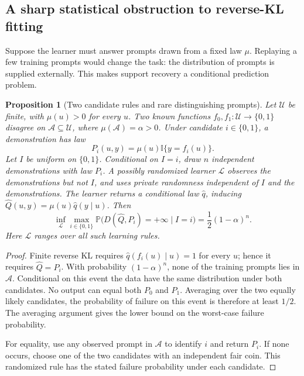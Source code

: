 \documentclass[11pt,twoside]{article}
\newcommand{\I}{\mathbb I}
\renewcommand{\P}{\mathbb P}
\newcommand{\KL}{D}
\newtheorem{proposition}[theorem]{Proposition}
\theoremstyle{definition}
\theoremstyle{remark}
\begin{document}
\subsection{A sharp statistical obstruction to reverse-KL fitting}
\label{app:conditional-support}

Suppose the learner must answer prompts drawn from a fixed law \(\mu\).
Replaying a few training prompts would change the task: the distribution
of prompts is supplied externally. This makes support recovery a
conditional prediction problem.

\begin{proposition}[Two candidate rules and rare distinguishing prompts]
\label{prop:conditional-support}
Let \(\mathcal U\) be finite, with \(\mu(u)>0\) for every \(u\).
Two known functions \(f_0,f_1:\mathcal U\to\{0,1\}\) disagree on
\(\mathcal A\subseteq\mathcal U\), where \(\mu(\mathcal A)=\alpha>0\).
Under candidate \(i\in\{0,1\}\), a demonstration has law
\[
 P_i(u,y)=\mu(u)\I\{y=f_i(u)\}.
\]
Let \(I\) be uniform on \(\{0,1\}\). Conditional on \(I=i\), draw
\(n\) independent demonstrations with law \(P_i\). A possibly randomized
learner \(\mathcal L\) observes the demonstrations but not \(I\), and uses
private randomness independent of \(I\) and the demonstrations.
The learner returns a conditional law \(\widehat q\), inducing
\(\widehat Q(u,y)=\mu(u)\widehat q(y\mid u)\).
Then
\begin{equation}
 \inf_{\mathcal L}\max_{i\in\{0,1\}}
 \P\bigl(\KL(\widehat Q, P_i)=+\infty\mid I=i\bigr)
 =\frac12(1-\alpha)^n.
 \label{eq:support-lower}
\end{equation}
Here \(\mathcal L\) ranges over all such learning rules.
\end{proposition}

\begin{proof}
Finite reverse KL requires
\(\widehat q(f_i(u)\mid u)=1\) for every \(u\); hence it requires
\(\widehat Q=P_i\).
With probability \((1-\alpha)^n\), none of the training prompts lies
in \(\mathcal A\). Conditional on this event the data have the same
distribution under both candidates.
No output can equal both \(P_0\) and \(P_1\).
Averaging over the two equally likely candidates, the probability of
failure on this event is therefore at least \(1/2\).
The averaging argument gives the lower bound on the worst-case failure probability.

For equality, use any observed prompt in \(\mathcal A\) to identify \(i\)
and return \(P_i\). If none occurs, choose one of the two candidates
with an independent fair coin. This randomized rule has the stated failure probability
under each candidate.
\end{proof}
\end{document}
